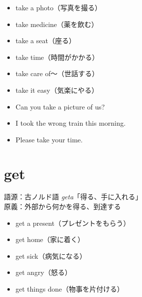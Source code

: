 ﻿\documentclass[a4paper,12pt]{article}
\begin{document}
\begin{tcolorbox}[title=意味の展開]

\begin{itemize}
  \item take a photo（写真を撮る）
  \item take medicine（薬を飲む）
  \item take a seat（座る）
  \item take time（時間がかかる）
  \item take care of〜（世話する）
  \item take it easy（気楽にやる）
\end{itemize}

\end{tcolorbox}

\begin{tcolorbox}[title=例文]

\begin{itemize}
  \item Can you take a picture of us?
  \item I took the wrong train this morning.
  \item Please take your time.
\end{itemize}

\end{tcolorbox}



\section*{get}

\begin{tcolorbox}[title=語源と原義]
語源：古ノルド語 \textit{geta}「得る、手に入れる」\\
原義：外部から何かを得る、到達する
\end{tcolorbox}

\begin{tcolorbox}[title=意味の展開]

\begin{itemize}
  \item get a present（プレゼントをもらう）
  \item get home（家に着く）
  \item get sick（病気になる）
  \item get angry（怒る）
  \item get things done（物事を片付ける）
\end{itemize}

\end{tcolorbox}
\end{document}
